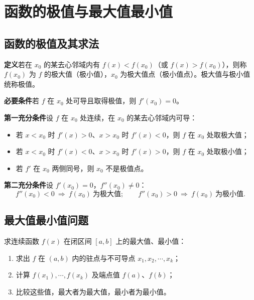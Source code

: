 \section{函数的极值与最大值最小值}

\subsection{函数的极值及其求法}
\textbf{定义}\quad 若在 $x_0$ 的某去心邻域内有 $f(x)<f(x_0)$（或 $f(x)>f(x_0)$），则称 $f(x_0)$ 为 $f$ 的极大值（极小值），$x_0$ 为极大值点（极小值点）。极大值与极小值统称极值。

\textbf{必要条件}\quad 若 $f$ 在 $x_0$ 处可导且取得极值，则 $f'(x_0)=0$。

\textbf{第一充分条件}\quad 设 $f$ 在 $x_0$ 处连续，在 $x_0$ 的某去心邻域内可导：
\begin{itemize}
    \item 若 $x<x_0$ 时 $f'(x)>0$、$x>x_0$ 时 $f'(x)<0$，则 $f$ 在 $x_0$ 处取极大值；
    \item 若 $x<x_0$ 时 $f'(x)<0$、$x>x_0$ 时 $f'(x)>0$，则 $f$ 在 $x_0$ 处取极小值；
    \item 若 $f'$ 在 $x_0$ 两侧同号，则 $x_0$ 不是极值点。
\end{itemize}

\textbf{第二充分条件}\quad 设 $f'(x_0)=0$，$f''(x_0)\neq0$：
\[
f''(x_0)<0\ \Longrightarrow\ f(x_0)\ \text{为极大值};\qquad f''(x_0)>0\ \Longrightarrow\ f(x_0)\ \text{为极小值}.
\]


\subsection{最大值最小值问题}
求连续函数 $f(x)$ 在闭区间 $[a,b]$ 上的最大值、最小值：
\begin{enumerate}
    \item 求出 $f$ 在 $(a,b)$ 内的驻点与不可导点 $x_1,x_2,\cdots,x_k$；
    \item 计算 $f(x_1),\cdots,f(x_k)$ 及端点值 $f(a)$、$f(b)$；
    \item 比较这些值，最大者为最大值，最小者为最小值。
\end{enumerate}

